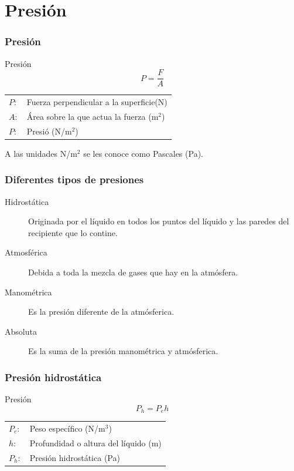 \documentclass[handout]{beamer}
\begin{document}
\section{Presión}
\begin{frame}
  \frametitle{Presión}
  \begin{block}{Presión}
    {\huge
      \[ P = \frac{F}{A}\]}
  \end{block}
  \begin{tabular}{ll}
    $P:$ & Fuerza perpendicular a la superficie(N) \\
    $A:$ & Área sobre la que actua la fuerza (m$^2$) \\
    $P:$ & Presió (N/m$^2$) \\
  \end{tabular}
  \begin{block}{}
    A las unidades N/m$^2$ se les conoce como Pascales (Pa).
  \end{block}
\end{frame}

\begin{frame}
  \frametitle{Diferentes tipos de presiones}
  \begin{description}
  \item[Hidrostática] Originada por el líquido en todos los puntos del líquido y las
    paredes del recipiente que lo contine.
  \item[Atmosférica] Debida a toda la mezcla de gases que hay en la atmósfera.
  \item[Manométrica] Es la presión diferente de la atmósferica.
  \item[Absoluta] Es la suma de la presión manométrica y atmósferica.
  \end{description}
\end{frame}


\begin{frame}
  \frametitle{Presión hidrostática}
  
  \begin{block}{Presión}
    {\huge
      \[ P_{h} = P_{e}h\]}
  \end{block}
  \begin{tabular}{ll}
    $P_{e}:$ & Peso específico (N/m$^3$) \\
    $h:$ & Profundidad o altura del líquido (m) \\
    $P_{h}:$ & Presión hidrostática (Pa) \\
  \end{tabular}
\end{frame}
\end{document}
